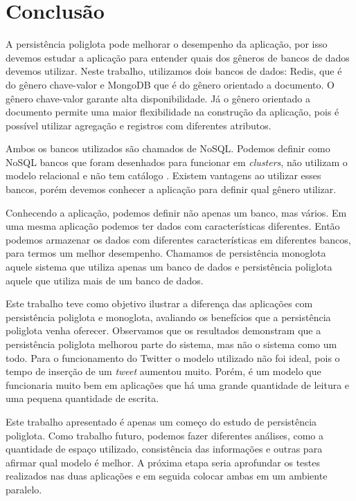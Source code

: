 \chapter{Conclusão}
\label{chap:conclusao}

A persistência poliglota pode melhorar o desempenho da aplicação, por isso devemos estudar a aplicação para entender quais dos gêneros de bancos de dados devemos utilizar. Neste trabalho, utilizamos dois bancos de dados: \ac{Redis}, que é do gênero chave-valor e MongoDB que é do gênero orientado a documento. O gênero chave-valor garante alta disponibilidade. Já o gênero orientado a documento permite uma maior flexibilidade na construção da aplicação, pois é possível utilizar agregação e registros com diferentes atributos.

Ambos os bancos utilizados são chamados de NoSQL. Podemos definir como NoSQL bancos que foram desenhados para funcionar em \textit{clusters}, não utilizam o modelo relacional e não tem catálogo \cite{NoSQL}. Existem vantagens ao utilizar esses bancos, porém devemos conhecer a aplicação para definir qual gênero utilizar.

Conhecendo a aplicação, podemos definir não apenas um banco, mas vários. Em uma mesma aplicação podemos ter dados com características diferentes. Então podemos armazenar os dados com diferentes características em diferentes bancos, para termos um melhor desempenho. Chamamos de persistência monoglota aquele sistema que utiliza apenas um banco de dados e persistência poliglota aquele que utiliza mais de um banco de dados.

Este trabalho teve como objetivo ilustrar a diferença das aplicações com persistência poliglota e monoglota, avaliando os benefícios que a persistência poliglota venha oferecer. Observamos que os resultados demonstram que a persistência poliglota melhorou parte do sistema, mas não o sistema como um todo. Para o funcionamento do Twitter o modelo utilizado não foi ideal, pois o tempo de inserção de um \textit{tweet} aumentou muito. Porém, é um modelo que funcionaria muito bem em aplicações que há uma grande quantidade de leitura e uma pequena quantidade de escrita.

Este trabalho apresentado é apenas um começo do estudo de persistência poliglota. Como trabalho futuro, podemos fazer diferentes análises, como a quantidade de espaço utilizado, consistência das informações e outras para afirmar qual modelo é melhor. A próxima etapa seria aprofundar os testes realizados nas duas aplicações e em seguida colocar ambas em um ambiente paralelo.


